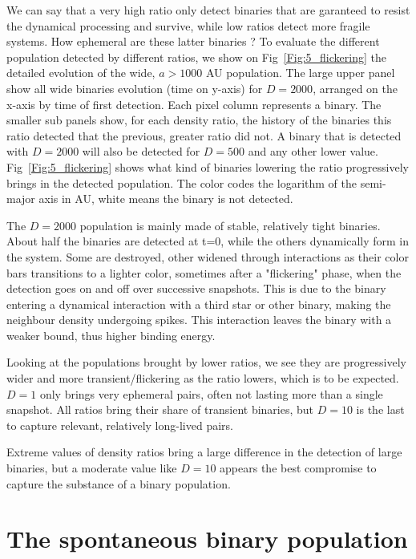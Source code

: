  We can say that a very high ratio only detect binaries that are garanteed to resist the dynamical processing and survive, while low ratios detect more fragile systems. How ephemeral are these latter binaries ? To evaluate the different population detected by different ratios, we show on Fig~\ref{Fig:5_flickering} the detailed evolution of the wide, $a>1000$ AU population. The large upper panel show all wide binaries evolution (time on y-axis) for $D=2000$, arranged on the x-axis by time of first detection. Each pixel column represents a binary. The smaller sub panels show, for each density ratio, the history of the binaries this ratio detected that the previous, greater ratio did not. A binary that is detected with $D=2000$ will also be detected for $D=500$ and any other lower value. Fig~\ref{Fig:5_flickering} shows what kind of binaries lowering the ratio progressively brings in the detected population. The color codes the logarithm of the semi-major axis in AU, white means the binary is not detected.

The $D=2000$ population is mainly made of stable, relatively tight binaries. About half the binaries are detected at t=0, while the others dynamically form in the system. Some are destroyed, other widened through interactions as their color bars transitions to a lighter color, sometimes after a "flickering" phase, when the detection goes on and off over successive snapshots. This is due to the binary entering a dynamical interaction with a third star or other binary, making the neighbour density undergoing spikes. This interaction leaves the binary with a weaker bound, thus higher binding energy. 

Looking at the populations brought by lower ratios, we see they are progressively wider and more transient/flickering as the ratio lowers, which is to be expected. $D=1$ only brings very ephemeral pairs, often not lasting more than a single snapshot. All ratios bring their share of transient binaries, but $D=10$ is the last to capture relevant, relatively long-lived pairs.

Extreme values of density ratios bring a large difference in the detection of large binaries, but a moderate value like $D=10$ appears the best compromise to capture the substance of a binary population.










\section{The spontaneous binary population} 
\label{Sec:5_spontaneous}



